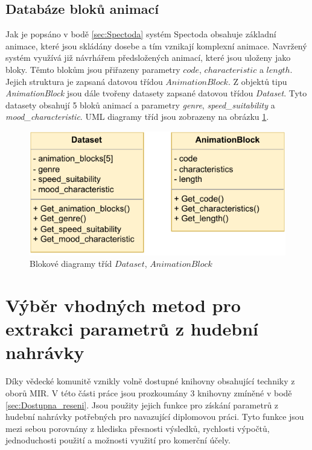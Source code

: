 

\subsection{Databáze bloků animací} \label{sec:Database_structure}
Jak je popsáno v bodě \ref{sec:Spectoda} systém Spectoda obsahuje základní animace, které jsou skládány dosebe a tím vznikají komplexní animace. Navržený systém využívá již návrhářem předsložených animací, které jsou uloženy jako bloky. Těmto blokům jsou přiřazeny parametry $code$, $characteristic$ a $length$. Jejich struktura je zapsaná datovou třídou $AnimationBlock$.
Z objektů tipu \textit{AnimationBlock} jsou dále tvořeny datasety zapsané datovou třídou \textit{Dataset}. Tyto datasety obsahují 5 bloků animací a parametry \textit{genre}, \textit{speed\_suitability} a \textit{mood\_characteristic}. UML diagramy tříd jsou zobrazeny na obrázku \ref{fig:UML_diagram_Dataset_AnimationBlock}.

\begin{figure}[H]
    \centering
    \includegraphics[width = 0.7\linewidth]{obrazky/UML_diagram_Dataset_and_AnimationBlock.pdf}
    \caption{Blokové diagramy tříd $Dataset$, $AnimationBlock$}
    \label{fig:UML_diagram_Dataset_AnimationBlock}
\end{figure}

\section{Výběr vhodných metod pro extrakci parametrů z hudební nahrávky} \label{sec:Exktrakce_vlastnosti_metody}
Díky vědecké komunitě vznikly volně dostupné knihovny obsahující techniky z oborů MIR. V této části práce jsou prozkoumány 3 knihovny zmíněné v bodě \ref{sec:Dostupna_reseni}. Jsou použity jejich funkce pro získání parametrů z hudební nahrávky potřebných pro navazující diplomovou práci. Tyto funkce jsou mezi sebou porovnány z hlediska přesnosti výsledků, rychlosti výpočtů, jednoduchosti použití a možnosti využití pro komerční účely. 

